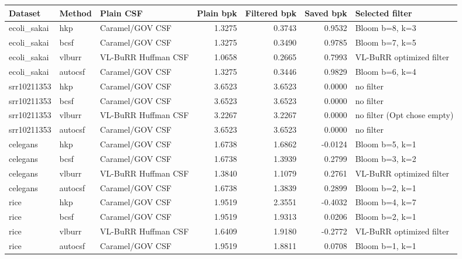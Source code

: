 \begin{tabular}{lllrrrl}
Dataset & Method & Plain CSF & Plain bpk & Filtered bpk & Saved bpk & Selected filter \\
\hline
ecoli\_sakai & hkp & Caramel/GOV CSF & 1.3275 & 0.3743 & 0.9532 & Bloom b=8, k=3 \\
ecoli\_sakai & bcsf & Caramel/GOV CSF & 1.3275 & 0.3490 & 0.9785 & Bloom b=7, k=5 \\
ecoli\_sakai & vlburr & VL-BuRR Huffman CSF & 1.0658 & 0.2665 & 0.7993 & VL-BuRR optimized filter \\
ecoli\_sakai & autocsf & Caramel/GOV CSF & 1.3275 & 0.3446 & 0.9829 & Bloom b=6, k=4 \\
srr10211353 & hkp & Caramel/GOV CSF & 3.6523 & 3.6523 & 0.0000 & no filter \\
srr10211353 & bcsf & Caramel/GOV CSF & 3.6523 & 3.6523 & 0.0000 & no filter \\
srr10211353 & vlburr & VL-BuRR Huffman CSF & 3.2267 & 3.2267 & 0.0000 & no filter (Opt chose empty) \\
srr10211353 & autocsf & Caramel/GOV CSF & 3.6523 & 3.6523 & 0.0000 & no filter \\
celegans & hkp & Caramel/GOV CSF & 1.6738 & 1.6862 & -0.0124 & Bloom b=5, k=1 \\
celegans & bcsf & Caramel/GOV CSF & 1.6738 & 1.3939 & 0.2799 & Bloom b=3, k=2 \\
celegans & vlburr & VL-BuRR Huffman CSF & 1.3840 & 1.1079 & 0.2761 & VL-BuRR optimized filter \\
celegans & autocsf & Caramel/GOV CSF & 1.6738 & 1.3839 & 0.2899 & Bloom b=2, k=1 \\
rice & hkp & Caramel/GOV CSF & 1.9519 & 2.3551 & -0.4032 & Bloom b=4, k=7 \\
rice & bcsf & Caramel/GOV CSF & 1.9519 & 1.9313 & 0.0206 & Bloom b=2, k=1 \\
rice & vlburr & VL-BuRR Huffman CSF & 1.6409 & 1.9180 & -0.2772 & VL-BuRR optimized filter \\
rice & autocsf & Caramel/GOV CSF & 1.9519 & 1.8811 & 0.0708 & Bloom b=1, k=1 \\
\end{tabular}
